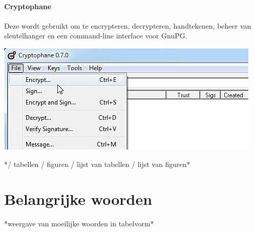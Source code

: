 \documentclass[12pt]{article}
\begin{document}
\paragraph{Cryptophane}
Deze wordt gebruikt om te encrypteren, decrypteren, handtekenen, beheer van sleutelhanger en een command-line interface voor GnuPG.\\
\begin{center}
\includegraphics[scale=0.6]{Pictures/cryptophane}
\end{center}


*/ tabellen / figuren / lijst van tabellen / lijst van figuren*

\section{Belangrijke woorden}\label{Belangrijke woorden}
*weergave van moeilijke woorden in tabelvorm*



\end{document}

